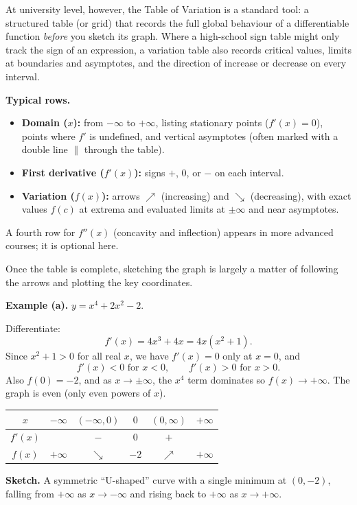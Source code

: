 \documentclass[12pt]{article}
\theoremstyle{definition}
\begin{document}
At university level, however, the Table of Variation is a standard tool: a structured table (or grid) that records the full global behaviour of a differentiable function \emph{before} you sketch its graph. Where a high-school sign table might only track the sign of an expression, a variation table also records critical values, limits at boundaries and asymptotes, and the direction of increase or decrease on every interval.

\textbf{Typical rows.}
\begin{itemize}[leftmargin=*]
  \item \textbf{Domain ($x$):} from $-\infty$ to $+\infty$, listing stationary points ($f'(x)=0$), points where $f'$ is undefined, and vertical asymptotes (often marked with a double line $\|$ through the table).
  \item \textbf{First derivative ($f'(x)$):} signs $+$, $0$, or $-$ on each interval.
  \item \textbf{Variation ($f(x)$):} arrows $\nearrow$ (increasing) and $\searrow$ (decreasing), with exact values $f(c)$ at extrema and evaluated limits at $\pm\infty$ and near asymptotes.
\end{itemize}
A fourth row for $f''(x)$ (concavity and inflection) appears in more advanced courses; it is optional here.

Once the table is complete, sketching the graph is largely a matter of following the arrows and plotting the key coordinates.

\medskip
\noindent\textbf{Example (a).} $y=x^4+2x^2-2$.

Differentiate:
\[
f'(x)=4x^3+4x=4x(x^2+1).
\]
Since $x^2+1>0$ for all real $x$, we have $f'(x)=0$ only at $x=0$, and
\[
f'(x)<0 \text{ for } x<0,
\qquad
f'(x)>0 \text{ for } x>0.
\]
Also $f(0)=-2$, and as $x\to\pm\infty$, the $x^4$ term dominates so $f(x)\to+\infty$. The graph is even (only even powers of $x$).

\medskip
\noindent
\begin{center}
\renewcommand{\arraystretch}{1.35}
\begin{tabular}{c|ccccc}
$x$ & $-\infty$ & $(-\infty,0)$ & $0$ & $(0,\infty)$ & $+\infty$ \\ \hline
$f'(x)$ & & $-$ & $0$ & $+$ & \\ \hline
$f(x)$ & $+\infty$ & $\searrow$ & $-2$ & $\nearrow$ & $+\infty$
\end{tabular}
\end{center}

\medskip
\noindent\textbf{Sketch.} A symmetric ``U-shaped'' curve with a single minimum at $(0,-2)$, falling from $+\infty$ as $x\to-\infty$ and rising back to $+\infty$ as $x\to+\infty$.
\end{document}
